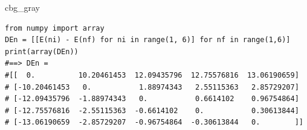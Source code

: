 \documentclass[%
oneside,                 %
final,                   %
10pt,french]{article}
\newenvironment{_cod_tight}[1]{
   \def\FrameCommand{\colorbox{#1}}
   \FrameRule0.6pt\MakeFramed {\FrameRestore}\vskip3mm}
   {\vskip0mm\endMakeFramed}
\newenvironment{cod}[1]{
\bgroup\rmfamily
\fboxsep=0mm\relax
\begin{_cod_tight}{#1}
\list{}{\parsep=-2mm\parskip=0mm\topsep=0pt\leftmargin=2mm
\rightmargin=2\leftmargin\leftmargin=4pt\relax}
\item\relax}
{\endlist\end{_cod_tight}\egroup}
\newenvironment{doconceexercise}{}{}
\begin{document}
\begin{doconceexercise}
\begin{cod}{cbg_gray}\begin{verbatim}
from numpy import array
DEn = [[E(ni) - E(nf) for ni in range(1, 6)] for nf in range(1,6)]
print(array(DEn))
#==> DEn =
#[[  0.          10.20461453  12.09435796  12.75576816  13.06190659]
# [-10.20461453   0.           1.88974343   2.55115363   2.85729207]
# [-12.09435796  -1.88974343   0.           0.6614102    0.96754864]
# [-12.75576816  -2.55115363  -0.6614102    0.           0.30613844]
# [-13.06190659  -2.85729207  -0.96754864  -0.30613844   0.        ]]
\end{verbatim}
\end{cod}
\noindent


\end{doconceexercise}


\end{document}
